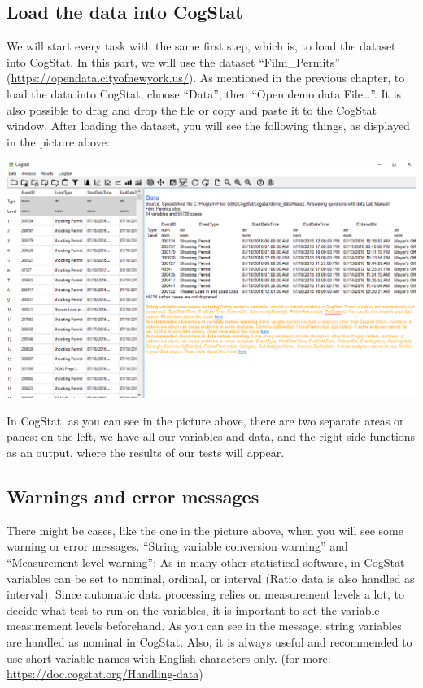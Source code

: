 \documentclass[
]{book}
\begin{document}
\hypertarget{load-the-data-into-cogstat}{%
\subsection{Load the data into CogStat}\label{load-the-data-into-cogstat}}

We will start every task with the same first step, which is, to load the dataset into CogStat. In this part, we will use the dataset ``Film\_Permits'' (\url{https://opendata.cityofnewyork.us/}). As mentioned in the previous chapter, to load the data into CogStat, choose ``Data'', then ``Open demo data File\ldots{}''. It is also possible to drag and drop the file or copy and paste it to the CogStat window. After loading the dataset, you will see the following things, as displayed in the picture above:

\includegraphics{img/ch1/CS_homepage.png}

In CogStat, as you can see in the picture above, there are two separate areas or panes: on the left, we have all our variables and data, and the right side functions as an output, where the results of our tests will appear.

\hypertarget{warnings-and-error-messages}{%
\subsection{Warnings and error messages}\label{warnings-and-error-messages}}

There might be cases, like the one in the picture above, when you will see some warning or error messages.
``String variable conversion warning'' and ``Measurement level warning'': As in many other statistical software, in CogStat variables can be set to nominal, ordinal, or interval (Ratio data is also handled as interval). Since automatic data processing relies on measurement levels a lot, to decide what test to run on the variables, it is important to set the variable measurement levels beforehand. As you can see in the message, string variables are handled as nominal in CogStat.
Also, it is always useful and recommended to use short variable names with English characters only. (for more: \url{https://doc.cogstat.org/Handling-data})
\end{document}

